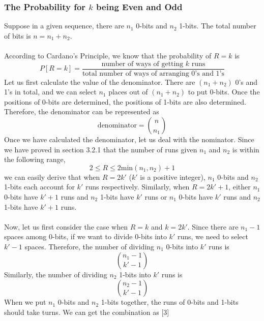 \documentclass[a4paper,12pt]{article}
\begin{document}
\subsubsection{The Probability for $k$ being Even and Odd}
\noindent Suppose in a given sequence, there are $n_1$ 0-bits and $n_2$ 1-bits. The total number of bits is $n=n_1+n_2$.\\\\
According to Cardano's Principle, we know that the probability of $R=k$ is
\begin{equation*}
P[R=k]=\frac{\text{number of ways of getting } k \text{ runs}}{\text{total number of ways of arranging 0's and 1's}}
\end{equation*}
Let us first calculate the value of the denominator. There are $(n_1+n_2)$ 0's and 1's in total, and we can select $n_1$ places out of $(n_1+n_2)$ to put 0-bits. Once the positions of 0-bits are determined, the positions of 1-bits are also determined. Therefore, the denominator can be represented as
\begin{equation*}
\text{denominator}=\binom {n} {n_1}
\end{equation*}
Once we have calculated the denominator, let us deal with the nominator. Since we have proved in section 3.2.1 that the number of runs given $n_1$ and $n_2$ is within the following range,
\begin{equation*}
2\leq R \leq 2 \text{min}(n_1,n_2)+1
\end{equation*}
we can easily derive that when $R=2k'$ ($k'$ is a positive integer), $n_1$ 0-bits and $n_2$ 1-bits each account for $k'$ runs respectively. Similarly, when $R=2k'+1$, either $n_1$ 0-bits have $k'+1$ runs and $n_2$ 1-bits have $k'$ runs or $n_1$ 0-bits have $k'$ runs and $n_2$ 1-bits have $k'+1$ runs.\\\\
 Now, let us first consider the case when $R=k$ and $k=2k'$. Since there are $n_1-1$ spaces among 0-bits, if we want to divide 0-bits into $k'$ runs, we need to select $k'-1$ spaces. Therefore, the number of dividing $n_1$ 0-bits into $k'$ runs is \\
\begin{equation*}
\binom {n_1-1} {k'-1}
\end{equation*}
Similarly, the number of dividing $n_2$ 1-bits into $k'$ runs is
\begin{equation*}
\binom {n_2-1} {k'-1}
\end{equation*}
When we put $n_1$ 0-bits and $n_2$ 1-bits together, the runs of 0-bits and 1-bits should take turns. We can get the combination as [3]
\end{document}
